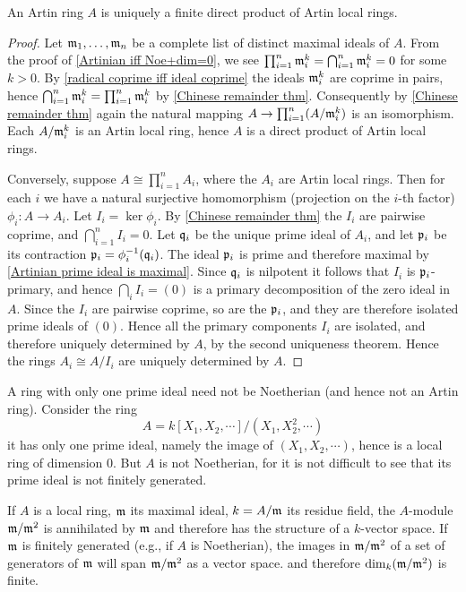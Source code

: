 \begin{theorem}\label{Art structure thm}
An Artin ring $A$ is uniquely a finite direct product of Artin local rings.
\end{theorem}
\begin{proof}
Let $\mathfrak{m}_1,\dots,\mathfrak{m}_n$ be a complete list of distinct maximal ideals of $A$. From the proof of \cref{Artinian iff Noe+dim=0}, we see $\prod_{i=1}^{n}\mathfrak{m}_i^k=\bigcap_{i=1}^{n}\mathfrak{m}_i^k=0$ for some $k>0$. By \cref{radical coprime iff ideal coprime} the ideals $\mathfrak{m}_i^k$ are coprime in pairs, hence $\bigcap_{i=1}^n\mathfrak{m}_i^k=\prod_{i=1}^{n}\mathfrak{m}_i^k$ by \cref{Chinese remainder thm}. Consequently by \cref{Chinese remainder thm} again the natural mapping $A\to\prod_{i=1}^{n}(A/\mathfrak{m}_i^k)$ is an isomorphism. Each $A/\mathfrak{m}_i^k$ is an Artin local ring, hence $A$ is a direct product of Artin local rings.\par
Conversely, suppose $A\cong\prod_{i=1}^{n}A_i$, where the $A_i$ are Artin local rings. Then for each $i$ we have a natural surjective homomorphism (projection on the $i$-th factor) $\phi_i:A\to A_i$. Let $I_i=\ker\phi_i$. By \cref{Chinese remainder thm} the $I_i$ are pairwise coprime, and $\bigcap_{i=1}^nI_i=0$. Let $\mathfrak{q}_i$ be the unique prime ideal of $A_i$, and let $\mathfrak{p}_i$ be its contraction $\mathfrak{p}_i=\phi_i^{-1}(\mathfrak{q}_i)$. The ideal $\mathfrak{p}_i$ is prime and therefore maximal by \cref{Artinian prime ideal is maximal}. Since $\mathfrak{q}_i$ is nilpotent it follows that $I_i$ is $\mathfrak{p}_i$-primary, and hence $\bigcap_iI_i=(0)$ is a primary decomposition of the zero ideal in $A$. Since the $I_i$ are pairwise coprime, so are the $\mathfrak{p}_i$, and they are therefore isolated prime ideals of $(0)$. Hence all the primary components $I_i$ are isolated, and therefore uniquely determined by $A$, by the second uniqueness theorem. Hence the rings $A_i\cong A/I_i$ are uniquely determined by $A$.
\end{proof}
\begin{example}
A ring with only one prime ideal need not be Noetherian (and hence not an Artin ring). Consider the ring
\[A=k[X_1,X_2,\cdots]/(X_1,X_2^2,\cdots)\]
it has only one prime ideal, namely the image of $(X_1,X_2,\cdots)$, hence is a local ring of dimension $0$. But $A$ is not Noetherian, for it is not difficult to see that its prime ideal is not finitely generated.
\end{example}
If $A$ is a local ring, $\mathfrak{m}$ its maximal ideal, $k=A/\mathfrak{m}$ its residue field, the
$A$-module $\mathfrak{m}/\mathfrak{m}^2$ is annihilated by $\mathfrak{m}$ and therefore has the structure of a $k$-vector space. If $\mathfrak{m}$ is finitely generated (e.g., if $A$ is Noetherian), the images in $\mathfrak{m}/\mathfrak{m}^2$ of a set of generators of $\mathfrak{m}$ will span $\mathfrak{m}/\mathfrak{m}^2$ as a vector space. and therefore $\dim_k(\mathfrak{m}/\mathfrak{m}^2)$ is finite.
